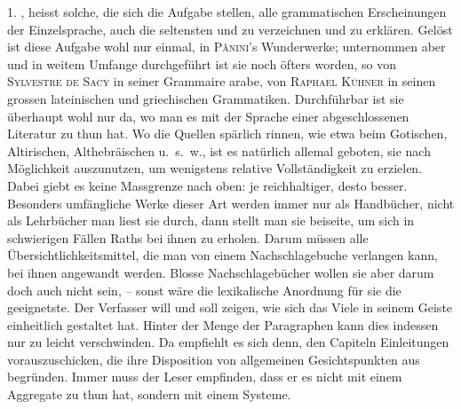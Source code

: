 1. ,  heisst solche, die sich die Aufgabe stellen, alle grammatischen Erscheinungen der Einzelsprache, auch die seltensten und  zu verzeichnen und zu erklären. Gelöst ist diese Aufgabe wohl nur einmal, in \textsc{Pânini}’s Wunderwerke; unternommen aber und in weitem Umfange durchgeführt ist sie noch öfters worden, so von \textsc{Sylvestre de Sacy} in seiner Grammaire arabe, von \textsc{Raphael Kühner} in seinen grossen lateinischen und griechischen Grammatiken. Durchführbar ist sie überhaupt wohl nur da, wo man es mit der Sprache einer abgeschlossenen Literatur zu thun hat. Wo die Quellen spärlich rinnen, wie etwa beim Gotischen, Altirischen, Althebräischen u.~s.~w., ist es natürlich allemal geboten, sie nach Möglichkeit auszunutzen, um wenigstens relative Vollständigkeit zu erzielen. Dabei giebt es keine Massgrenze nach oben: je reichhaltiger, desto besser. Besonders umfängliche Werke dieser Art werden immer nur als Handbücher, nicht als Lehrbücher  man liest sie durch, dann stellt man sie beiseite, um sich in schwierigen Fällen Raths bei ihnen zu erholen. Darum müssen alle Übersichtlichkeitsmittel, die man von einem Nachschlagebuche verlangen kann, bei ihnen angewandt werden. Blosse \label{fp.117} Nachschlagebücher wollen sie aber darum doch auch nicht sein, – sonst wäre die lexikalische Anordnung für sie die geeignetste. Der Verfasser will und soll zeigen, wie sich das Viele in seinem Geiste einheitlich gestaltet hat. Hinter der Menge der Paragraphen kann dies indessen nur zu leicht verschwinden. Da empfiehlt es sich denn, den Capiteln Einleitungen vorauszuschicken, die ihre Disposition von allgemeinen Gesichtspunkten aus begründen. Immer muss der Leser empfinden, dass er es nicht mit einem Aggregate zu thun hat, sondern mit einem Systeme.


